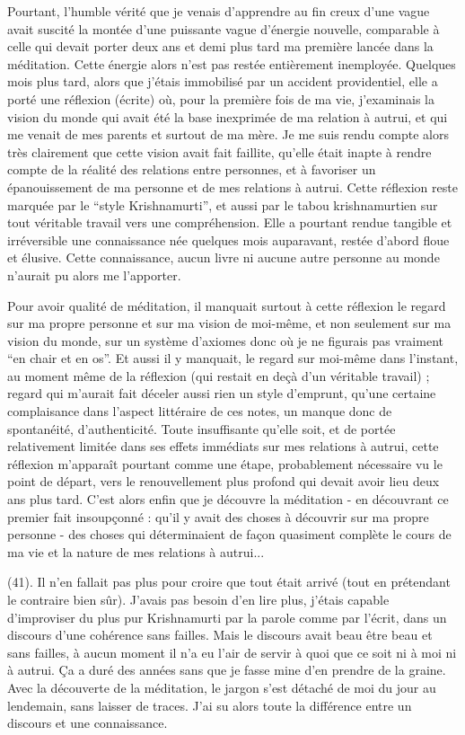 {Pourtant, l'humble vérité que je venais d'apprendre au fin creux d'une vague avait suscité la montée d'une puissante vague d'énergie nouvelle, comparable à celle qui devait porter deux ans et demi plus tard ma première lancée dans la méditation. Cette énergie alors n'est pas restée entièrement inemployée. Quelques mois plus tard, alors que j'étais immobilisé par un accident providentiel, elle a porté une réflexion (écrite) où, pour la première fois de ma vie, j'examinais la vision du monde qui avait été la base inexprimée de ma relation à autrui, et qui me venait de mes parents et surtout de ma mère. Je me suis rendu compte alors très clairement que cette vision avait fait faillite, qu'elle était inapte à rendre compte de la réalité des relations entre personnes, et à favoriser un épanouissement de ma personne et de mes relations à autrui. Cette réflexion reste marquée par le ``style Krishnamurti'', et aussi par le tabou krishnamurtien sur tout véritable travail vers une compréhension. Elle a pourtant rendue tangible et irréversible une connaissance née quelques mois auparavant, restée d'abord floue et élusive. Cette connaissance, aucun livre ni aucune autre personne au monde n'aurait pu alors me l'apporter.

Pour avoir qualité de méditation, il manquait surtout à cette réflexion le regard sur ma propre personne et sur ma vision de moi-même, et non seulement sur ma vision du monde, sur un système d'axiomes donc où je ne figurais pas vraiment ``en chair et en os''. Et aussi il y manquait, le regard sur moi-même dans l'instant, au moment même de la réflexion (qui restait en deçà d'un véritable travail) ; regard qui m'aurait fait déceler aussi rien un style d'emprunt, qu'une certaine complaisance dans l'aspect littéraire de ces notes, un manque donc de spontanéité, d'authenticité. Toute insuffisante qu'elle soit, et de portée relativement limitée dans ses effets immédiats sur mes relations à autrui, cette réflexion m'apparaît pourtant comme une étape, probablement nécessaire vu le point de départ, vers le renouvellement plus profond qui devait avoir lieu deux ans plus tard. C'est alors enfin que je découvre la méditation - en découvrant ce premier fait insoupçonné : qu'il y avait des choses à découvrir sur ma propre personne - des choses qui déterminaient de façon quasiment complète le cours de ma vie et la nature de mes relations à autrui...}(41). Il n'en fallait pas plus pour croire que tout était arrivé (tout en prétendant le contraire bien sûr). J'avais pas besoin d'en lire plus, j'étais capable d'improviser du plus pur Krishnamurti par la parole comme par l'écrit, dans un discours d'une cohérence sans failles. Mais le discours avait beau être beau et sans failles, à aucun moment il n'a eu l'air de servir à quoi que ce soit ni à moi ni à autrui. Ça a duré des années sans que je fasse mine d'en prendre de la graine. Avec la découverte de la méditation, le jargon s'est détaché de moi du jour au lendemain, sans laisser de traces. J'ai su alors toute la différence entre un discours et une connaissance.

